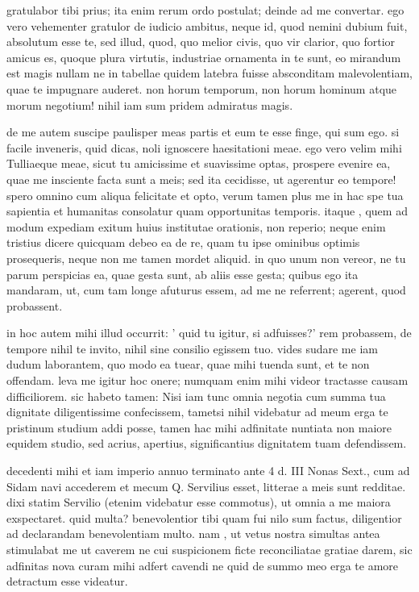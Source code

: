 


 gratulabor tibi prius; ita enim rerum ordo postulat; deinde ad me convertar. ego vero vehementer gratulor de iudicio ambitus, neque id, quod nemini dubium fuit, absolutum esse te, sed illud, quod, quo melior civis, quo vir clarior, quo fortior amicus es, quoque plura virtutis, industriae ornamenta in te sunt, eo mirandum est magis nullam ne in tabellae quidem latebra fuisse absconditam malevolentiam, quae te impugnare auderet. non horum temporum, non horum hominum atque morum negotium! nihil iam sum pridem admiratus magis.

 de me autem suscipe paulisper meas partis et eum te esse finge, qui sum ego. si facile inveneris, quid dicas, noli ignoscere haesitationi meae. ego vero velim mihi Tulliaeque meae, sicut tu amicissime et suavissime optas, prospere evenire ea, quae me insciente facta sunt a meis; sed ita cecidisse, ut agerentur eo tempore! spero omnino cum aliqua felicitate et opto, verum tamen plus me in hac spe tua sapientia et humanitas consolatur quam opportunitas temporis. itaque , quem ad modum expediam exitum huius institutae orationis, non reperio; neque enim tristius dicere quicquam debeo ea de re, quam tu ipse ominibus optimis prosequeris, neque non me tamen mordet aliquid. in quo unum non vereor, ne tu parum perspicias ea, quae gesta sunt, ab aliis esse gesta; quibus ego ita mandaram, ut, cum tam longe afuturus essem, ad me ne referrent; agerent, quod probassent.

 in hoc autem mihi illud occurrit: ' quid tu igitur, si adfuisses?' rem probassem, de tempore nihil te invito, nihil sine consilio egissem tuo. vides sudare me iam dudum laborantem, quo modo ea tuear, quae mihi tuenda sunt, et te non offendam. leva me igitur hoc onere; numquam enim mihi videor tractasse causam difficiliorem. sic habeto tamen: Nisi iam tunc omnia negotia cum summa tua dignitate diligentissime confecissem, tametsi nihil videbatur ad meum erga te pristinum studium addi posse, tamen hac mihi adfinitate nuntiata non maiore equidem studio, sed acrius, apertius, significantius dignitatem tuam defendissem.

 decedenti mihi et iam imperio annuo terminato ante 4 d. III Nonas Sext., cum ad Sidam navi accederem et mecum Q. Servilius esset, litterae a meis sunt redditae. dixi statim Servilio (etenim videbatur esse commotus), ut omnia a me maiora exspectaret. quid multa? benevolentior tibi quam fui nilo sum factus, diligentior ad declarandam benevolentiam multo. nam , ut vetus nostra simultas antea stimulabat me ut caverem ne cui suspicionem ficte reconciliatae gratiae darem, sic adfinitas nova curam mihi adfert cavendi ne quid de summo meo erga te amore detractum esse videatur.
